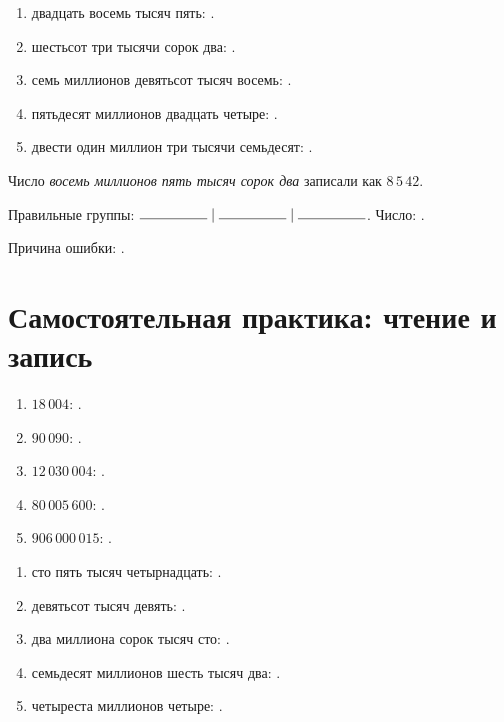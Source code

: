 \begin{practicebox}
  \begin{enumerate}[label=\textbf{\arabic*.}]
    \item двадцать восемь тысяч пять: \answerblank[48mm].
    \item шестьсот три тысячи сорок два: \answerblank[48mm].
    \item семь миллионов девятьсот тысяч восемь: \answerblank[48mm].
    \item пятьдесят миллионов двадцать четыре: \answerblank[48mm].
    \item двести один миллион три тысячи семьдесят: \answerblank[48mm].
  \end{enumerate}
\end{practicebox}

\begin{warningbox}
  Число \emph{восемь миллионов пять тысяч сорок два} записали как
  \(8\,5\,42\).

  Правильные группы:
  \(\answerblank[17mm]\;|\;\answerblank[17mm]\;|\;\answerblank[17mm]\).
  Число: \answerblank[38mm].

  Причина ошибки: \answerblank[82mm].
\end{warningbox}

\newpage
\section{Самостоятельная практика: чтение и запись}

\begin{practicebox}
  \begin{enumerate}[label=\textbf{\arabic*.}]
    \item \(18\,004\): \answerblank[96mm].
    \item \(90\,090\): \answerblank[96mm].
    \item \(12\,030\,004\): \answerblank[82mm].
    \item \(80\,005\,600\): \answerblank[78mm].
    \item \(906\,000\,015\): \answerblank[70mm].
  \end{enumerate}
\end{practicebox}

\begin{practicebox}
  \begin{enumerate}[label=\textbf{\arabic*.}]
    \item сто пять тысяч четырнадцать: \answerblank[45mm].
    \item девятьсот тысяч девять: \answerblank[45mm].
    \item два миллиона сорок тысяч сто: \answerblank[45mm].
    \item семьдесят миллионов шесть тысяч два: \answerblank[45mm].
    \item четыреста миллионов четыре: \answerblank[45mm].
  \end{enumerate}
\end{practicebox}

